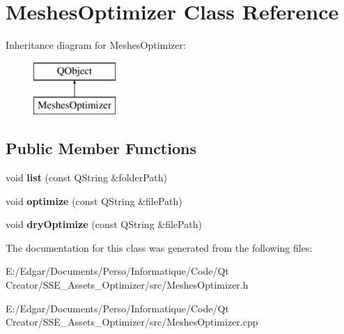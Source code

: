 \hypertarget{class_meshes_optimizer}{}\section{Meshes\+Optimizer Class Reference}
\label{class_meshes_optimizer}
Inheritance diagram for Meshes\+Optimizer\+:\begin{figure}[H]
\begin{center}
\leavevmode
\includegraphics[height=2.000000cm]{class_meshes_optimizer}
\end{center}
\end{figure}
\subsection*{Public Member Functions}
\begin{DoxyCompactItemize}
\item 
\mbox{\label{class_meshes_optimizer_a55c89cdea1bd4fd7e74c7fdcef45517f}} 
void {\bfseries list} (const Q\+String \&folder\+Path)
\item 
\mbox{\label{class_meshes_optimizer_a88bcc12872ccdc3d270fda5d944397e9}} 
void {\bfseries optimize} (const Q\+String \&file\+Path)
\item 
\mbox{\label{class_meshes_optimizer_aad3321ce493e3b01d7bd315ab8c376ce}} 
void {\bfseries dry\+Optimize} (const Q\+String \&file\+Path)
\end{DoxyCompactItemize}


The documentation for this class was generated from the following files\+:\begin{DoxyCompactItemize}
\item 
E\+:/\+Edgar/\+Documents/\+Perso/\+Informatique/\+Code/\+Qt Creator/\+S\+S\+E\+\_\+\+Assets\+\_\+\+Optimizer/src/Meshes\+Optimizer.\+h\item 
E\+:/\+Edgar/\+Documents/\+Perso/\+Informatique/\+Code/\+Qt Creator/\+S\+S\+E\+\_\+\+Assets\+\_\+\+Optimizer/src/Meshes\+Optimizer.\+cpp\end{DoxyCompactItemize}
